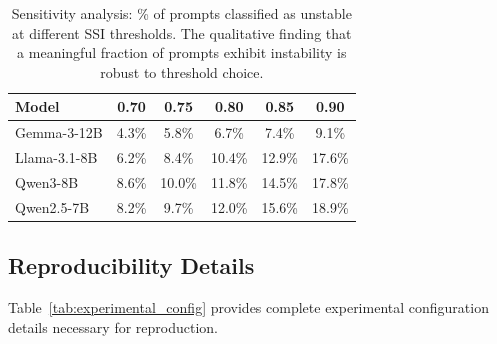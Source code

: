 \documentclass[11pt]{article}
\begin{document}
\begin{table}[h]
\centering
\caption{Sensitivity analysis: \% of prompts classified as unstable at different SSI thresholds. The qualitative finding that a meaningful fraction of prompts exhibit instability is robust to threshold choice.}
\label{tab:threshold_sensitivity}
\begin{tabular}{lccccc}
\toprule
\textbf{Model} & \textbf{0.70} & \textbf{0.75} & \textbf{0.80} & \textbf{0.85} & \textbf{0.90} \\
\midrule
Gemma-3-12B & 4.3\% & 5.8\% & 6.7\% & 7.4\% & 9.1\% \\
Llama-3.1-8B & 6.2\% & 8.4\% & 10.4\% & 12.9\% & 17.6\% \\
Qwen3-8B & 8.6\% & 10.0\% & 11.8\% & 14.5\% & 17.8\% \\
Qwen2.5-7B & 8.2\% & 9.7\% & 12.0\% & 15.6\% & 18.9\% \\
\bottomrule
\end{tabular}
\end{table}

\subsection{Reproducibility Details}

Table~\ref{tab:experimental_config} provides complete experimental configuration details necessary for reproduction.
\end{document}
